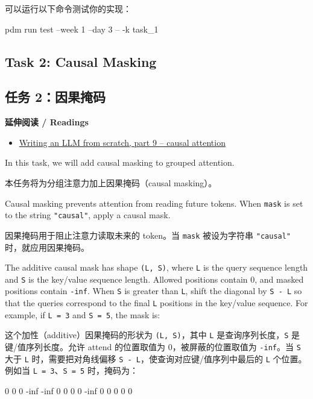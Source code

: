 \documentclass[11pt,a4paper]{article}
\newenvironment{zhpar}{%
  \par\smallskip\begingroup\color{zhcolor}\small\ignorespaces%
}{\endgroup\par\smallskip}
\begin{document}
\begin{zhpar}
可以运行以下命令测试你的实现：
\end{zhpar}
\begin{codeblock}
pdm run test --week 1 --day 3 -- -k task_1
\end{codeblock}

\subsection*{Task 2: Causal Masking}

\subsection*{任务 2：因果掩码}

\textbf{延伸阅读 / Readings}

\begin{itemize}[leftmargin=1.6em,itemsep=0.15em,parsep=0pt]
\item \href{https://www.gilesthomas.com/2025/03/llm-from-scratch-9-causal-attention}{Writing an LLM from scratch, part 9 -- causal attention}
\end{itemize}

In this task, we will add causal masking to grouped attention.

\begin{zhpar}
本任务将为分组注意力加上因果掩码（causal masking）。
\end{zhpar}
Causal masking prevents attention from reading future tokens. When \texttt{mask} is set to the string \texttt{"causal"}, apply a causal mask.

\begin{zhpar}
因果掩码用于阻止注意力读取未来的 token。当 \texttt{mask} 被设为字符串 \texttt{"causal"} 时，就应用因果掩码。
\end{zhpar}
The additive causal mask has shape \texttt{(L, S)}, where \texttt{L} is the query sequence length and \texttt{S} is the key/value sequence length. Allowed positions contain 0, and masked positions contain \texttt{-inf}. When \texttt{S} is greater than \texttt{L}, shift the diagonal by \texttt{S - L} so that the queries correspond to the final \texttt{L} positions in the key/value sequence. For example, if \texttt{L = 3} and \texttt{S = 5}, the mask is:

\begin{zhpar}
这个加性（additive）因果掩码的形状为 \texttt{(L, S)}，其中 \texttt{L} 是查询序列长度，\texttt{S} 是键/值序列长度。允许 attend 的位置取值为 0，被屏蔽的位置取值为 \texttt{-inf}。当 \texttt{S} 大于 \texttt{L} 时，需要把对角线偏移 \texttt{S - L}，使查询对应键/值序列中最后的 \texttt{L} 个位置。例如当 \texttt{L = 3}、\texttt{S = 5} 时，掩码为：
\end{zhpar}
\begin{codeblock}
0   0   0   -inf -inf
0   0   0   0    -inf
0   0   0   0    0
\end{codeblock}
\end{document}
